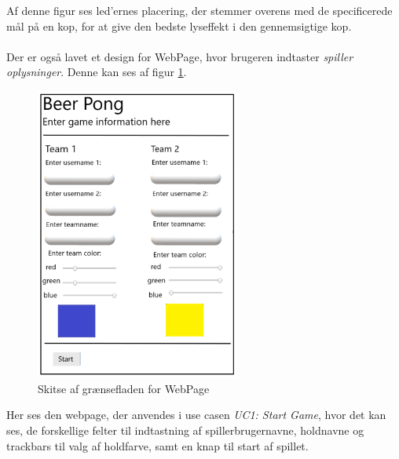 \documentclass[Rapport/Rapport_main.tex]{subfiles}
\begin{document}
Af denne figur ses led'ernes placering, der stemmer overens med de specificerede mål på en kop, for at give den bedste lyseffekt i den gennemsigtige kop.\\\\
Der er også lavet et design for WebPage, hvor brugeren indtaster \textit{spiller oplysninger}. Denne kan ses af figur \ref{fig:rap_webpage_sketch}.

\begin{figure}[H]
    \centering
    \includegraphics[width=0.6\textwidth]{Kravspecifikation/Ikke-funktionelle/graphics/WebPage_IF.png}
    \caption{Skitse af grænsefladen for WebPage}
   \label{fig:rap_webpage_sketch}
\end{figure}

Her ses den webpage, der anvendes i use casen \textit{UC1: Start Game}, hvor det kan ses, de forskellige felter til indtastning af spillerbrugernavne, holdnavne og trackbars til valg af holdfarve, samt en knap til start af spillet.
\end{document}
